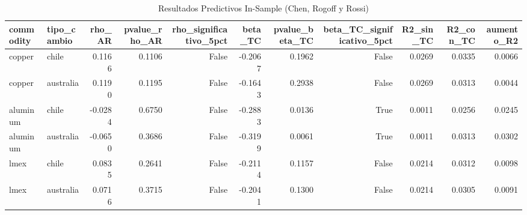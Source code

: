 \begin{table}
\caption{Resultados Predictivos In-Sample (Chen, Rogoff y Rossi)}
\label{tab:res_e}
\begin{tabular}{llrrrrrrrrr}
\toprule
commodity & tipo_cambio & rho_AR & pvalue_rho_AR & rho_significativo_5pct & beta_TC & pvalue_beta_TC & beta_TC_significativo_5pct & R2_sin_TC & R2_con_TC & aumento_R2 \\
\midrule
copper & chile & 0.1166 & 0.1106 & False & -0.2067 & 0.1962 & False & 0.0269 & 0.0335 & 0.0066 \\
copper & australia & 0.1190 & 0.1195 & False & -0.1643 & 0.2938 & False & 0.0269 & 0.0313 & 0.0044 \\
aluminum & chile & -0.0284 & 0.6750 & False & -0.2883 & 0.0136 & True & 0.0011 & 0.0256 & 0.0245 \\
aluminum & australia & -0.0650 & 0.3686 & False & -0.3199 & 0.0061 & True & 0.0011 & 0.0313 & 0.0302 \\
lmex & chile & 0.0835 & 0.2641 & False & -0.2114 & 0.1157 & False & 0.0214 & 0.0312 & 0.0098 \\
lmex & australia & 0.0716 & 0.3715 & False & -0.2041 & 0.1300 & False & 0.0214 & 0.0305 & 0.0091 \\
\bottomrule
\end{tabular}
\end{table}

